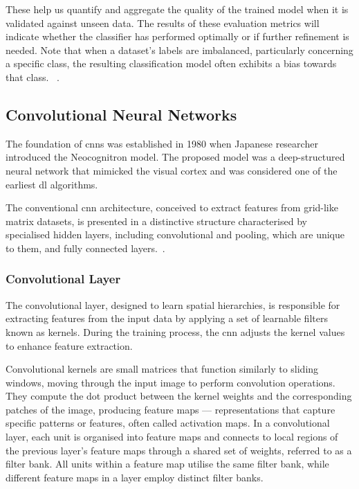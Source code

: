 These help us quantify and aggregate the quality of the trained model when it is validated against unseen data. The results of these evaluation metrics will indicate whether the classifier has performed optimally or if further refinement is needed. Note that when a dataset's labels are imbalanced, particularly concerning a specific class, the resulting classification model often exhibits a bias towards that class.
~\cite{naidu_review_2023}.



\FloatBarrier


\subsection{Convolutional Neural Networks}

The foundation of \acfp{cnn} was established in 1980 when Japanese researcher \textcite{fukushima_neocognitron_1980} introduced the Neocognitron model. The proposed model was a deep-structured neural network that mimicked the visual cortex and was considered one of the earliest \ac{dl} algorithms.

The conventional \ac{cnn} architecture, conceived to extract features from grid-like matrix datasets, is presented in a distinctive structure characterised by specialised hidden layers, including convolutional and pooling, which are unique to them, and fully connected layers.~\cite{lecun_deep_2015, dai_introduction_2021}. 

\subsubsection{Convolutional Layer} %
The convolutional layer, designed to learn spatial hierarchies, is responsible for extracting features from the input data by applying a set of learnable filters known as kernels. During the training process, the \ac{cnn} adjusts the kernel values to enhance feature extraction.

Convolutional kernels are small matrices that function similarly to sliding windows, moving through the input image to perform convolution operations. They compute the dot product between the kernel weights and the corresponding patches of the image, producing feature maps — representations that capture specific patterns or features, often called activation maps. In a convolutional layer, each unit is organised into feature maps and connects to local regions of the previous layer's feature maps through a shared set of weights, referred to as a filter bank.
All units within a feature map utilise the same filter bank, while different feature maps in a layer employ distinct filter banks.
 
